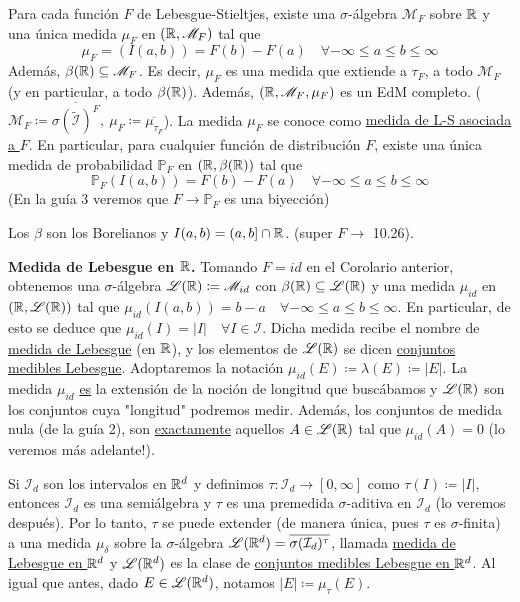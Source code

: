 \begin{corollary}
	Para cada función $F$ de Lebesgue-Stieltjes, existe una $\sigma$-álgebra $\mathscr{M}_F$ sobre $\mathbb{R}$ y una única medida $\mu_F$ en $(\mathbb{R},\mathscr{M}_F)$ tal que
	\[ \mu_F = (I(a,b)) = F(b) - F(a) \quad \forall -\infty \leq a \leq b \leq \infty \]
	Además, $\beta(\mathbb{R}) \subseteq \mathscr{M}_F$. Es decir, $\mu_F$ es una medida que extiende a $\tau_F$, a todo $\mathscr{M}_F$ (y en particular, a todo $\beta(\mathbb{R})$). Además, $(\mathbb{R}, \mathscr{M}_F, \mu_F)$ es un EdM completo. ($\mathscr{M}_F \coloneq \overline{\sigma(\widetilde{\mathcal{I}})^F},\ \mu_F \coloneq \overline{\mu_{\tau_F}}$). La medida $\mu_F$ se conoce como \underline{medida de L-S asociada a $F$}. En particular, para cualquier función de distribución $F$, existe una única medida de probabilidad $\mathbb{P}_F$ en $(\mathbb{R},\beta(\mathbb{R}))$ tal que 
	\[ \mathbb{P}_F(I(a,b)) = F(b) - F(a) \quad \forall -\infty \leq a \leq b \leq \infty \]
	(En la guía 3 veremos que $F \to \mathbb{P}_F$ es una biyección)
\end{corollary}
\medskip{}
\begin{note}
	Los $\beta$ son los Borelianos y $I(a,b) = (a,b] \cap \mathbb{R}$. (super $F \to$ 10.26).
\end{note}
\smallskip
\begin{eg}[Importante!]
	\textbf{Medida de Lebesgue en $\mathbb{R}$.} Tomando $F = id$ en el Corolario anterior, obtenemos una $\sigma$-álgebra $\mathscr{L}(\mathbb{R}) \coloneq \mathscr{M}_{id}$ con $\beta(\mathbb{R}) \subseteq \mathscr{L}(\mathbb{R})$ y una medida $\mu_{id}$ en $(\mathbb{R},\mathscr{L}(\mathbb{R}))$ tal que $\mu_{id}(I(a,b)) = b-a \quad \forall -\infty \leq a \leq b \leq \infty$. En particular, de esto se deduce que $\mu_{id}(I) = |I|\quad \forall I \in \mathcal{I}$. Dicha medida recibe el nombre de \underline{medida de Lebesgue} (en $\mathbb{R}$), y los elementos de $\mathscr{L}(\mathbb{R})$ se dicen \underline{conjuntos medibles Lebesgue}. Adoptaremos la notación $\mu_{id}(E) \coloneq \lambda(E) \coloneq |E|$. La medida $\mu_{id}$ \underline{es} la extensión de la noción de longitud que buscábamos y $\mathscr{L}(\mathbb{R})$ son los conjuntos cuya "longitud" podremos medir. Además, los conjuntos de medida nula (de la guía 2), son \underline{exactamente} aquellos $A \in \mathscr{L}(\mathbb{R})$ tal que $\mu_{id}(A) = 0$ (lo veremos más adelante!).
\end{eg}
\smallskip
\begin{eg}
	Si $\mathcal{I}_d$ son los intervalos en $\mathbb{R}^d$ y definimos $\tau:\mathcal{I}_d \to [0,\infty]$ como $\tau(I)\coloneq|I|$, entonces $\mathcal{I}_d$ es una semiálgebra y $\tau$ es una premedida $\sigma$-aditiva en $\mathcal{I}_d$ (lo veremos después). Por lo tanto, $\tau$ se puede extender (de manera única, pues $\tau$ es $\sigma$-finita) a una medida $\mu_{\delta}$ sobre la $\sigma$-álgebra $\mathscr{L}(\mathbb{R}^d) = \overline{\sigma(\mathcal{I}_d)^{\tau}}$, llamada \underline{medida de Lebesgue en $\mathbb{R}^d$} y $\mathscr{L}(\mathbb{R}^d)$ es la clase de \underline{conjuntos medibles Lebesgue en $\mathbb{R}^d$}. Al igual que antes, dado $E \in \mathscr{L}(\mathbb{R}^d)$, notamos $|E| \coloneq \mu_{\tau}(E)$.
\end{eg}
